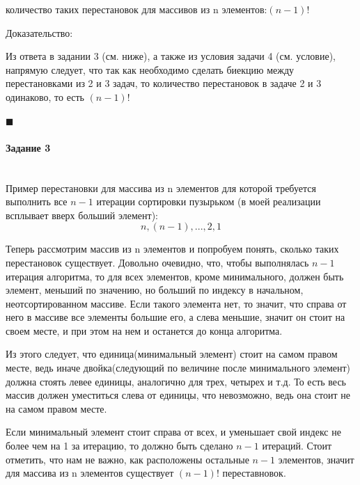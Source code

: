 \documentclass{article}
\newcommand{\myparagraph}[1]{\paragraph{#1}\mbox{}\\}
\begin{document}
  количество таких перестановок для массивов из n элементов:$(n - 1)!$ 

  Доказательство:

  Из ответа в задании 3 (см. ниже), а также из условия задачи 4 (см. условие), напрямую следует, что так как необходимо сделать биекцию между перестановками из 2 и 3 задач, то количество перестановок в задаче 2 и 3 одинаково, то есть $(n - 1)!$

  \begin{flushright}
    $\blacksquare$
  \end{flushright}

  \myparagraph{Задание 3}

  Пример перестановки для массива из n элементов для которой требуется выполнить все $n - 1$ итерации сортировки пузырьком (в моей реализации всплывает вверх больший элемент):
  $$ n, (n - 1), ..., 2, 1 $$

  Теперь рассмотрим массив из n элементов и попробуем понять, сколько таких перестановок существует. Довольно очевидно, что, чтобы выполнялась $n - 1$ итерация алгоритма, то для всех элементов, кроме минимального, должен быть элемент, меньший по значению, но больший по индексу в начальном, неотсортированном массиве. Если такого элемента нет, то значит, что справа от него в массиве все элементы большие его, а слева меньшие, значит он стоит на своем месте, и при этом на нем и останется до конца алгоритма.

  Из этого следует, что единица(минимальный элемент) стоит на самом правом месте, ведь иначе двойка(следующий по величине после минимального элемент) должна стоять левее единицы, аналогично для трех, четырех и т.д. То есть весь массив должен уместиться слева от единицы, что невозможно, ведь она стоит не на самом правом месте.

  Если минимальный элемент стоит справа от всех, и уменьшает свой индекс не более чем на 1 за итерацию, то должно быть сделано $n-1$ итераций. Стоит отметить, что нам не важно, как расположены остальные $n - 1$ элементов, значит для массива из n элементов существует $(n - 1)!$ переставновок.

 
\end{document}
